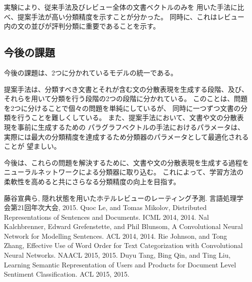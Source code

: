 \documentclass{ttithesis}
\begin{document}
実験により、従来手法\cite{fujitani15}及びレビュー全体の文書ベクトルのみを
用いた手法に比べ、提案手法が高い分類精度を示すことが分かった。
同時に、これはレビュー内の文の並びが評判分類に重要であることを示す。



\subsection{今後の課題}

今後の課題は、2つに分かれているモデルの統一である。

提案手法は、分類すべき文書とそれが含む文の分散表現を生成する段階、及び、
それらを用いて分類を行う段階の2つの段階に分かれている。
このことは、問題を2つに分けることで個々の問題を単純にしているが、
同時に一つずつ文書の分類を行うことを難しくしている。
また、提案手法において、文書や文の分散表現を事前に生成するための
パラグラフベクトルの手法におけるパラメータは、
実際には最大の分類精度を達成するため分類器のパラメータとして最適化されることが
望ましい。

今後は、これらの問題を解決するために、文書や文の分散表現を生成する過程を
ニューラルネットワークによる分類器に取り込む。
これによって、学習方法の柔軟性を高めると共にさらなる分類精度の向上を目指す。




\begin{thebibliography}{9}
  藤谷宣典ら,
  隠れ状態を用いたホテルレビューのレーティング予測.
  言語処理学会第21回年次大会, 2015.
  Quoc Le, and Tomas Mikolov,
  Distributed Representations of Sentences and Documents.
  ICML 2014, 2014.
  Nal Kalchbrenner, Edward Grefenstette, and Phil Blunsom,
  A Convolutional Neural Network for Modelling Sentences.
  ACL 2014, 2014.
  Rie Johnson, and Tong Zhang,
  Effective Use of Word Order for Text Categorization
  with Convolutional Neural Networks.
  NAACL 2015, 2015.
  Duyu Tang, Bing Qin, and Ting Liu,
  Learning Semantic Representation of Users and Products
  for Document Level Sentiment Classification.
  ACL 2015, 2015.
\end{thebibliography}
\end{document}
